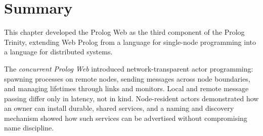 %
%
%
%
%
%


\section{Summary}\label{sec:prolog-web-summary}

This chapter developed the Prolog Web as the third component of the
Prolog Trinity, extending Web Prolog from a language for single-node
programming into a language for distributed systems.

The \emph{concurrent Prolog Web} introduced network-transparent
actor programming: spawning processes on remote nodes, sending
messages across node boundaries, and managing lifetimes through links
and monitors. Local and remote message passing differ only in
latency, not in kind. Node-resident actors demonstrated how an owner
can install durable, shared services, and a naming and discovery
mechanism showed how such services can be advertised without
compromising name discipline.

